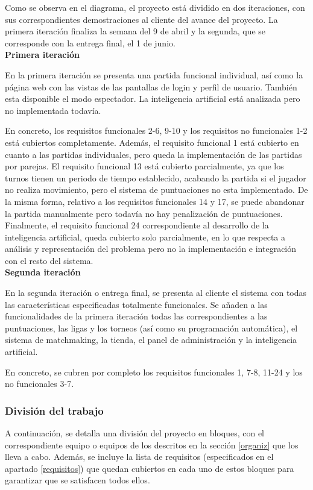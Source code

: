 Como se observa en el diagrama, el proyecto está dividido en dos iteraciones, con sus correspondientes demostraciones al cliente del avance del proyecto. La primera iteración finaliza la semana del 9 de abril y la segunda, que se corresponde con la entrega final, el 1 de junio.\\

\textbf{Primera iteración}

En la primera iteración se presenta una partida funcional individual, así como la página web con las vistas de las pantallas de login y perfil de usuario. También esta disponible el modo espectador. La inteligencia artificial está analizada pero no implementada todavía.

En concreto, los requisitos funcionales 2-6, 9-10 y los requisitos no funcionales 1-2 está cubiertos completamente. Además, el requisito funcional 1 está cubierto en cuanto a las partidas individuales, pero queda la implementación de las partidas por parejas. El requisito funcional 13 está cubierto parcialmente, ya que los turnos tienen un periodo de tiempo establecido, acabando la partida si el jugador no realiza movimiento, pero el sistema de puntuaciones no esta implementado.
De la misma forma, relativo a los requisitos funcionales 14 y 17, se puede abandonar la partida manualmente pero todavía no hay penalización de puntuaciones. Finalmente, el requisito funcional 24 correspondiente al desarrollo de la inteligencia artificial, queda cubierto solo parcialmente, en lo que respecta a análisis y representación del problema pero no la implementación e integración con el resto del sistema.\\

\textbf{Segunda iteración}

En la segunda iteración o entrega final, se presenta al cliente el sistema con todas las características especificadas totalmente funcionales. Se añaden a las funcionalidades de la primera iteración todas las correspondientes a las puntuaciones, las ligas y los torneos (así como su programación automática), el sistema de matchmaking, la tienda, el panel de administración y la inteligencia artificial.

En concreto, se cubren por completo los requisitos funcionales 1, 7-8, 11-24 y los no funcionales 3-7.


\subsubsection*{División del trabajo}
\label{repartotrabajo}
A continuación, se detalla una división del proyecto en bloques, con el correspondiente equipo o equipos de los descritos en la sección \ref{organiz} que los lleva a cabo. Además, se incluye la lista de requisitos (especificados en el apartado \ref{requisitos}) que quedan cubiertos en cada uno de estos bloques para garantizar que se satisfacen todos ellos.


